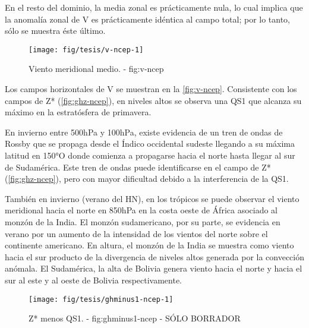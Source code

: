 \documentclass[spanish,a4paper]{book}
\begin{document}
En el resto del dominio, la media zonal es prácticamente nula, lo cual
implica que la anomalía zonal de V es prácticamente idéntica al campo
total; por lo tanto, sólo se muestra éste último.

\begin{landscape}\begin{figure}

{\centering \texttt{[image: fig/tesis/v-ncep-1]} 

}

\caption{Viento meridional medio. - fig:v-ncep}\label{fig:v-ncep}
\end{figure}
\end{landscape}

Los campos horizontales de V se muestran en la \autoref{fig:v-ncep}.
Consistente con los campos de Z* (\autoref{fig:ghz-ncep}), en niveles
altos se observa una QS1 que alcanza su máximo en la estratósfera de
primavera.

En invierno entre 500hPa y 100hPa, existe evidencia de un tren de ondas
de Rossby que se propaga desde el Índico occidental sudeste llegando a
su máxima latitud en 150°O donde comienza a propagarse hacia el norte
hasta llegar al sur de Sudamérica. Este tren de ondas puede
identificarse en el campo de Z* (\autoref{fig:ghz-ncep}), pero con mayor
dificultad debido a la interferencia de la QS1.

También en invierno (verano del HN), en los trópicos se puede observar
el viento meridional hacia el norte en 850hPa en la costa oeste de
África asociado al monzón de la India. El monzón sudamericano, por su
parte, se evidencia en verano por un aumento de la intensidad de los
vientos del norte sobre el continente americano. En altura, el monzón de
la India se muestra como viento hacia el sur producto de la divergencia
de niveles altos generada por la convección anómala. El Sudamérica, la
alta de Bolivia genera viento hacia el norte y hacia el sur al este y al
oeste de Bolivia respectivamente.

\begin{landscape}\begin{figure}

{\centering \texttt{[image: fig/tesis/ghminus1-ncep-1]} 

}

\caption{Z* menos QS1. - fig:ghminus1-ncep - SÓLO BORRADOR}\label{fig:ghminus1-ncep}
\end{figure}
\end{landscape}
\end{document}
